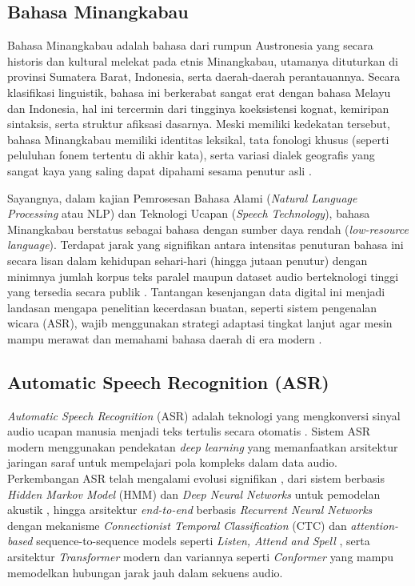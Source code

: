 \subsection{Bahasa Minangkabau}
\label{II.BahasaMinangkabau}

Bahasa Minangkabau adalah bahasa dari rumpun Austronesia yang secara historis dan kultural melekat pada etnis Minangkabau, utamanya dituturkan di provinsi Sumatera Barat, Indonesia, serta daerah-daerah perantauannya. Secara klasifikasi linguistik, bahasa ini berkerabat sangat erat dengan bahasa Melayu dan Indonesia, hal ini tercermin dari tingginya koeksistensi kognat, kemiripan sintaksis, serta struktur afiksasi dasarnya. Meski memiliki kedekatan tersebut, bahasa Minangkabau memiliki identitas leksikal, tata fonologi khusus (seperti peluluhan fonem tertentu di akhir kata), serta variasi dialek geografis yang sangat kaya yang saling dapat dipahami sesama penutur asli \cite{koto2020minangkabau}. 

Sayangnya, dalam kajian Pemrosesan Bahasa Alami (\textit{Natural Language Processing} atau NLP) dan Teknologi Ucapan (\textit{Speech Technology}), bahasa Minangkabau berstatus sebagai bahasa dengan sumber daya rendah (\textit{low-resource language}). Terdapat jarak yang signifikan antara intensitas penuturan bahasa ini secara lisan dalam kehidupan sehari-hari (hingga jutaan penutur) dengan minimnya jumlah korpus teks paralel maupun dataset audio berteknologi tinggi yang tersedia secara publik \cite{sovia2022minangkabau}. Tantangan kesenjangan data digital ini menjadi landasan mengapa penelitian kecerdasan buatan, seperti sistem pengenalan wicara (ASR), wajib menggunakan strategi adaptasi tingkat lanjut agar mesin mampu merawat dan memahami bahasa daerah di era modern \cite{koto2020minangkabau}.

\subsection{Automatic Speech Recognition (ASR)}
\label{II.ASR}

\textit{Automatic Speech Recognition} (ASR) adalah teknologi yang mengkonversi sinyal audio ucapan manusia menjadi teks tertulis secara otomatis \cite{radford2023whisper}. Sistem ASR modern menggunakan pendekatan \textit{deep learning} yang memanfaatkan arsitektur jaringan saraf untuk mempelajari pola kompleks dalam data audio. Perkembangan ASR telah mengalami evolusi signifikan \cite{juang2005history}, dari sistem berbasis \textit{Hidden Markov Model} (HMM) \cite{rabiner1989hmm} dan \textit{Deep Neural Networks} untuk pemodelan akustik \cite{hinton2012dnn}, hingga arsitektur \textit{end-to-end} berbasis \textit{Recurrent Neural Networks} dengan mekanisme \textit{Connectionist Temporal Classification} (CTC) \cite{graves2006ctc,graves2013deep} dan \textit{attention-based} sequence-to-sequence models seperti \textit{Listen, Attend and Spell} \cite{chan2016listen}, serta arsitektur \textit{Transformer} modern \cite{vaswani2017attention} dan variannya seperti \textit{Conformer} \cite{gulati2020conformer} yang mampu memodelkan hubungan jarak jauh dalam sekuens audio.

